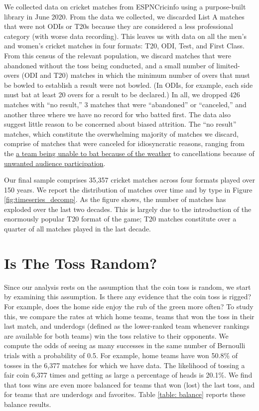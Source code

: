 \documentclass[12pt, letterpaper]{article}
\begin{document}
We collected data on cricket matches from ESPNCricinfo using a purpose-built library \citep{Willis_python-espncricinfo_A_Python_2022} in June 2020. From the data we collected, we discarded List A matches that were not ODIs or T20s because they are considered a less professional category (with worse data recording). This leaves us with data on all the men's and women's cricket matches in four formats: T20, ODI, Test, and First Class. From this census of the relevant population, we discard matches that were abandoned without the toss being conducted, and a small number of limited-overs (ODI and T20) matches in which the minimum number of overs that must be bowled to establish a result were not bowled. (In ODIs, for example, each side must bat at least 20 overs for a result to be declared.) In all, we dropped 426 matches with ``no result,'' 3 matches that were ``abandoned'' or ``canceled,'' and another three where we have no record for who batted first. The data also suggest little reason to be concerned about biased attrition. The ``no result'' matches, which constitute the overwhelming majority of matches we discard, comprise of matches that were canceled for idiosyncratic reasons, ranging from the \href{https://www.espncricinfo.com/series/shell-tri-series-1991-92-61203/australia-women-vs-england-women-final-66975/full-scorecard}{a team being unable to bat because of the weather} to cancellations because of \href{https://www.espncricinfo.com/series/australia-tour-of-pakistan-1982-83-61392/pakistan-vs-australia-3rd-odi-64196/full-scorecard}{unwanted audience participation}.

Our final sample comprises 35,357 cricket matches across four formats played over 150 years. We report the distribution of matches over time and by type in Figure \ref{fig:timeseries_decomp}. As the figure shows, the number of matches has exploded over the last two decades. This is largely due to the introduction of the enormously popular T20 format of the game; T20 matches constitute over a quarter of all matches played in the last decade.

\section{Is The Toss Random?}

Since our analysis rests on the assumption that the coin toss is random, we start by examining this assumption. Is there any evidence that the coin toss is rigged? For example, does the home side enjoy the rub of the green more often? To study this, we compare the rates at which home teams, teams that won the toss in their last match, and underdogs (defined as the lower-ranked team whenever rankings are available for both teams) win the toss relative to their opponents. We compute the odds of seeing as many successes in the same number of Bernoulli trials with a probability of 0.5. For example, home teams have won 50.8\% of tosses in the 6,377 matches for which we have data. The likelihood of tossing a fair coin 6,377 times and getting as large a percentage of heads is 20.1\%. We find that toss wins are even more balanced for teams that won (lost) the last toss, and for teams that are underdogs and favorites. Table \ref{table: balance} reports these balance results. 
\end{document}
